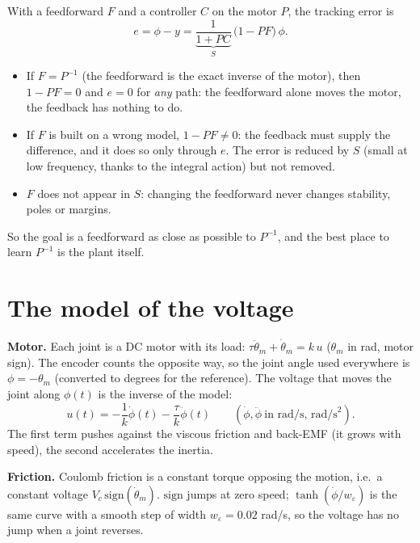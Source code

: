 \documentclass[10pt,a4paper]{article}
\begin{document}
With a feedforward $F$ and a controller $C$ on the motor $P$, the tracking error is
\begin{equation}\label{eq:err}
  e=\phi-y=\underbrace{\frac{1}{1+PC}}_{S}\,\bigl(1-PF\bigr)\,\phi .
\end{equation}
\begin{itemize}
  \item If $F=P^{-1}$ (the feedforward is the exact inverse of the motor), then $1-PF=0$ and $e=0$ for \emph{any} path: the
        feedforward alone moves the motor, the feedback has nothing to do.
  \item If $F$ is built on a wrong model, $1-PF\neq0$: the feedback must supply the difference, and it does so only through
        $e$. The error is reduced by $S$ (small at low frequency, thanks to the integral action) but not removed.
  \item $F$ does not appear in $S$: changing the feedforward never changes stability, poles or margins.
\end{itemize}
So the goal is a feedforward as close as possible to $P^{-1}$, and the best place to learn $P^{-1}$ is the plant itself.

\section{The model of the voltage}

\textbf{Motor.} Each joint is a DC motor with its load: $\tau\ddot\theta_m+\dot\theta_m=k\,u$ ($\theta_m$ in rad, motor sign).
The encoder counts the opposite way, so the joint angle used everywhere is $\phi=-\theta_m$ (converted to degrees for the
reference). The voltage that moves the joint along $\phi(t)$ is the inverse of the model:
\begin{equation}\label{eq:inv}
  u(t) = -\frac{1}{k}\dot\phi(t)-\frac{\tau}{k}\ddot\phi(t) \qquad(\dot\phi,\ddot\phi\ \text{in rad/s, rad/s}^2).
\end{equation}
The first term pushes against the viscous friction and back-EMF (it grows with speed), the second accelerates the inertia.

\textbf{Friction.} Coulomb friction is a constant torque opposing the motion, i.e.\ a constant voltage
$V_c\,\mathrm{sign}(\dot\theta_m)$. $\mathrm{sign}$ jumps at zero speed; $\tanh(\dot\phi/w_\varepsilon)$ is the same curve with
a smooth step of width $w_\varepsilon=0.02$ rad/s, so the voltage has no jump when a joint reverses.
\end{document}

